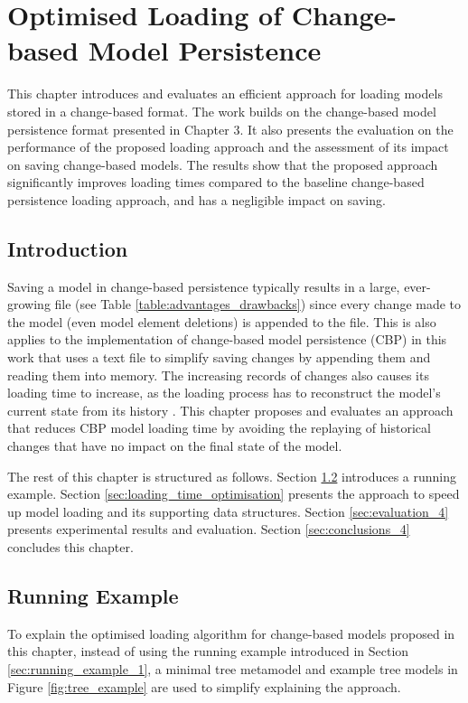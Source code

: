 \chapter{Optimised Loading of Change-based Model Persistence}
\label{ch:optimised_loading}

This chapter introduces and evaluates an efficient approach for loading models stored in a change-based format. The work builds on the change-based model persistence format presented in Chapter 3. It also presents the evaluation on the performance of the proposed loading approach and the assessment of its impact on saving change-based models. The results show that the proposed approach significantly improves loading times compared to the baseline change-based persistence loading approach, and has a negligible impact on saving.

\section{Introduction}
\label{sec:introduction_4}
Saving a model in change-based persistence typically results in a large, ever-growing file (see Table \ref{table:advantages_drawbacks}) since every change made to the model (even model element deletions) is appended to the file. This is also applies to the implementation of change-based model persistence (CBP) in this work that uses a text file to simplify saving changes by appending them and reading them into memory. The increasing records of changes also causes its loading time to increase, as the loading process has to reconstruct the model's current state from its history \cite{DBLP:conf/models/YohannisKP17}. This chapter proposes and evaluates an approach that reduces CBP model loading time by avoiding the replaying of historical changes that have no impact on the final state of the model.

The rest of this chapter is structured as follows. Section \ref{sec:case_study} introduces a running example.
Section \ref{sec:loading_time_optimisation} presents the approach to speed up model loading and its supporting data structures. Section \ref{sec:evaluation_4} presents experimental results and evaluation.  Section \ref{sec:conclusions_4} concludes this chapter.

\section{Running Example}
\label{sec:case_study}
To explain the optimised loading algorithm for change-based models proposed in this chapter, instead of using the running example introduced in Section \ref{sec:running_example_1}, a minimal tree metamodel and example tree models in Figure \ref{fig:tree_example} are used to simplify explaining the approach.
 
